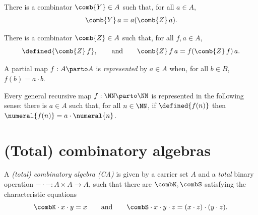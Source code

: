 \begin{definition}
  \label{def:combinator-Y}
  \leanok
  There is a combinator $\comb{Y} \in A$ such that, for all $a \in A$,
  \begin{equation*}
    \comb{Y} \, a = a (\comb{Z} \, a).
  \end{equation*}
\end{definition}

\begin{definition}
  \label{def:combinator-Z}
  \leanok
  There is a combinator $\comb{Z} \in A$ such that, for all $f, a \in A$,
  \begin{equation*}
    \defined{\comb{Z} \, f},
    \qquad\text{and}\qquad
    \comb{Z} \, f \, a = f (\comb{Z} \, f) \, a.
  \end{equation*}
\end{definition}

\begin{definition}
  \label{def:representable-function}
  A partial map $f : A \parto A$ is \emph{represented} by $a \in A$ when,
  for all $b \in B$, $f(b) = a \cdot b$.
\end{definition}

\begin{theorem}
  \label{thm:recursive-map-representable}
  Every general recursive map $f : \NN \parto \NN$ is represented in the following sense:
  there is $a \in A$ such that, for all $n \in \NN$, if $\defined{f(n)}$ then $\numeral{f(n)} = a \cdot \numeral{n}$.
\end{theorem}

\section{(Total) combinatory algebras}
\label{sec:total-comb-algebr}

\begin{definition}
  \label{def:CA}
  \leanok
  A \emph{(total) combinatory algebra (CA)} is given by a carrier set $A$ and a \emph{total} binary operation
  ${-} \cdot {-} : A \times A \to A$, such that there are $\combK, \combS$ satisfying the characteristic
  equations
  \begin{equation*}
    \combK \cdot x \cdot y = x
    \qquad\text{and}\qquad
    \combS \cdot x \cdot y \cdot z = (x \cdot z) \cdot (y \cdot z).
  \end{equation*}
\end{definition}

